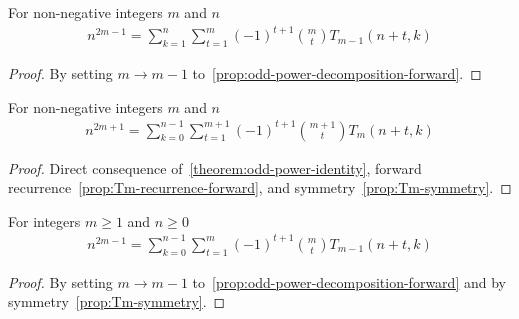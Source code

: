 \begin{proposition}
    \label{prop:odd-power-decomposition-forward-m-1}
    For non-negative integers $m$ and $n$
    \begin{align*}
        n^{2m-1} = \sum_{k=1}^{n} \sum_{t=1}^{m} (-1)^{t+1} \binom{m}{t} T_{m-1} (n+t, k)
    \end{align*}
    \begin{proof}
        By setting $m \rightarrow m-1$ to~\eqref{prop:odd-power-decomposition-forward}.
    \end{proof}
\end{proposition}

\begin{proposition}
    \label{prop:odd-power-decomposition-forward-shifted}
    For non-negative integers $m$ and $n$
    \begin{align*}
        n^{2m+1} = \sum_{k=0}^{n-1} \sum_{t=1}^{m+1} (-1)^{t+1} \binom{m+1}{t} T_{m} (n+t, k)
    \end{align*}
    \begin{proof}
        Direct consequence of~\eqref{theorem:odd-power-identity},
        forward recurrence~\eqref{prop:Tm-recurrence-forward}, and symmetry~\eqref{prop:Tm-symmetry}.
    \end{proof}
\end{proposition}

\begin{proposition}
    \label{prop:odd-power-decomposition-forward-m-1-shifted}
    For integers $m \geq 1$ and $n \geq 0$
    \begin{align*}
        n^{2m-1} = \sum_{k=0}^{n-1} \sum_{t=1}^{m} (-1)^{t+1} \binom{m}{t} T_{m-1} (n+t, k)
    \end{align*}
    \begin{proof}
        By setting $m \rightarrow m-1$ to~\eqref{prop:odd-power-decomposition-forward} and
        by symmetry~\eqref{prop:Tm-symmetry}.
    \end{proof}
\end{proposition}
